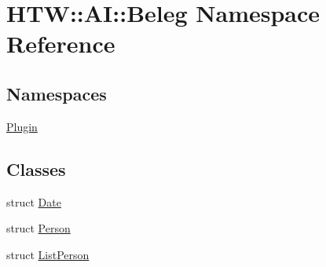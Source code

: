\hypertarget{namespace_h_t_w_1_1_a_i_1_1_beleg}{\section{H\-T\-W\-:\-:A\-I\-:\-:Beleg Namespace Reference}
\label{namespace_h_t_w_1_1_a_i_1_1_beleg}
}
\subsection*{Namespaces}
\begin{DoxyCompactItemize}
\item 
\hyperlink{namespace_h_t_w_1_1_a_i_1_1_beleg_1_1_plugin}{Plugin}
\end{DoxyCompactItemize}
\subsection*{Classes}
\begin{DoxyCompactItemize}
\item 
struct \hyperlink{struct_h_t_w_1_1_a_i_1_1_beleg_1_1_date}{Date}
\item 
struct \hyperlink{struct_h_t_w_1_1_a_i_1_1_beleg_1_1_person}{Person}
\item 
struct \hyperlink{struct_h_t_w_1_1_a_i_1_1_beleg_1_1_list_person}{List\-Person}
\end{DoxyCompactItemize}
